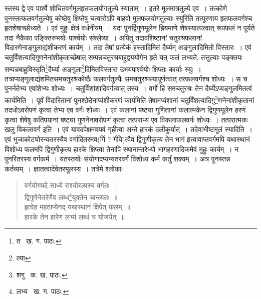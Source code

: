 \documentclass[11pt, openany]{book}
\begin{document}
{\noindent स्तस्य द्वे एव पार्श्वे शोधितवर्गमूलहृतफलयोगतुल्ये स्याताम्~। इतरे मूलमात्रतुल्ये एव~। तत्कोणे पुनस्तत्फलवर्गतुल्येषु कोष्ठेषु क्षिप्तेषु चत्वारोऽपि बाहवो मूलफलयोगतुल्याः स्युरिति तत्पूरणाय हृतफलवर्गश्च हृतशेषाच्छोध्यते~। एवं मुहुः क्षेत्रं वर्धनीयम्~। यदा पुनर्द्विगुणमूलेन ह्रियमाणे शेषस्याल्पत्वात् रूपफलं न पूर्यते तदा नैकैका पङ्क्तिरुभयोः पार्श्वयोः संश्लेष्या~। अपितु तदावशिष्टानां चतुरश्रफलानां विदारणेनाङ्गुलाद्यंशीकरणं कार्यम्~। तदा तेषां प्रत्येकं हस्तादिमितं दैर्घ्यम् अङ्गुलादिमितो विस्तारः~। एवं चतुर्विंशत्यादिगुणनेनांशीकृताच्छेषात् सम्पन्नचतुरश्रबाहुद्वययोगेन हृते यत् फलं लभ्यते, तत्तुल्याः पङ्क्तयः सम्पन्नबाहुविस्तृति\renewcommand{\thefootnote}{१}\footnote{त \textendash\ ख. ग. पाठः.}दैर्घ्या अङ्गुला\renewcommand{\thefootnote}{२}\footnote{ल्या}दिमितविस्तारा उभयपार्श्वयोः क्षिप्ताः कार्याः स्युः~। तत्राप्यङ्गुलाद्यंशमितसमचतुरश्रकोष्ठैः फलवर्गतुल्यैः समचतुरश्रस्यापूर्णत्वात् तत्फलवर्गश्च शोध्यः~। स च पुनर्नतेभ्य एवांशेभ्यः शोध्यः~। चतुर्विंशांशादिवर्गत्वात् तस्य~। वर्गो हि समचतुरश्रः तेन दैर्घ्येऽप्यङ्गुलमितत्वं कार्यमिति~। पूर्वं विदारितानां पुनश्छेदेनाप्यंशीकरणं कार्यमिति तेषामप्यंशानां चतुर्विंशत्यादिगु\renewcommand{\thefootnote}{३}\footnote{शगु \textendash\ क. ख. पाठः.}णनेनांशीकृतानां तदधोऽवरोपणं कृत्वा तेभ्य एव वर्गः शोध्यः~। एवं कलानां षष्ट्या गुणितानां कलात्मकेन द्विगुणमूलेन हरणं कृत्वा शेषेषु कतिपयानां षष्ट्या गुणनेनावरोपणं कृत्वा तत्पराभ्य एव विकलाफलवर्गः शोध्यः~। तत्परात्मकः खलु विकलावर्ग इति~। एवं यावदपेक्षमवयवं गृहीत्वा अन्ते हारकं दलीकुर्यात्~। तदेवाभीष्टमूलं स्यादिति~। एवं भुजाकोट्योरन्यतरस्यैव वर्गादितरमव(र्गि ? र्गयि)त्वैव द्विगुणीकृत्य तेन भागं हृत्वावाप्तवर्गमपि यथास्थानं विशोध्य फलमपि द्विगुणीकृत्य हारके क्षिप्त्वा तेनापि स्थानान्तरेभ्यो भागहरणादिकमेवं मुहुः कार्यम्~। न पुनरितरस्य वर्गकर्म~। यतस्तयोः संयोगादप्यन्यतरवर्गं विशोध्य कर्म कर्तुं शक्यम्~। अत्र पुनस्तन्न कर्तव्यम्~। ज्ञातत्वादेवेतरमूलस्य~। तत्रेमे श्लोकाः\textendash 

\begin{quote}
{\qt वर्गयोगपदे साध्ये राश्योरल्पस्य वर्गतः~।\\
द्विगुणेनेतरेणैव लब्ध\renewcommand{\thefootnote}{४}\footnote{लभ्य \textendash\ ख. ग. पाठः.}युक्तेन चान्त्यतः~॥\\
हृत्वेह महताप्येनद् यथास्थानं क्षिपेत् फलम्~॥\\
हारके तेन हारेण लभ्यं लब्धं च योजयेत्~॥}
\end{quote}

\newpage

}
\end{document}
